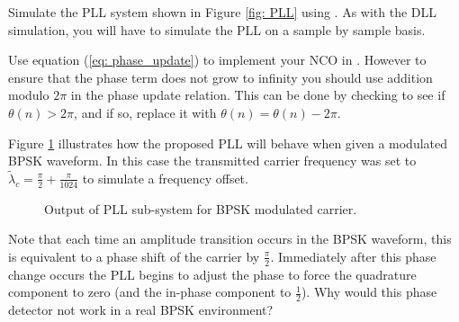
%
%
%
%
%

Simulate the PLL system shown in Figure \ref{fig: PLL} using
\matlab.  As with the DLL simulation, you will have to simulate
the PLL on a sample by sample basis. 

Use equation (\ref{eq: phase_update}) to implement your NCO in 
\matlab. However to ensure that the phase term does not grow
to infinity you should use addition modulo $2 \pi$ in the phase update
relation.  This can be done by checking to see if $\theta(n) > 2 \pi$,
and if so, replace it with $\theta(n) = \theta(n) - 2 \pi$.

Figure \ref{fig: pll_output} illustrates how the proposed PLL will
behave when given a modulated BPSK waveform.  In this case
the transmitted carrier frequency was set to $\tilde{\lambda}_c =
\frac{\pi}{2} + \frac{\pi}{1024}$ to simulate a frequency offset.

\begin{figure}[ht]
   \begin{center}
      \caption{Output of PLL sub-system for BPSK modulated carrier.}
      \label{fig: pll_output}
   \end{center}
\end{figure}

Note that each time an amplitude transition occurs in the BPSK
waveform, this is equivalent to a phase shift of the carrier
by $\frac{\pi}{2}$.  Immediately after this phase change occurs
the PLL begins to adjust the phase to force the quadrature
component to zero (and the in-phase component to $\frac{1}{2}$).
Why would this phase detector not work in a real BPSK environment?
